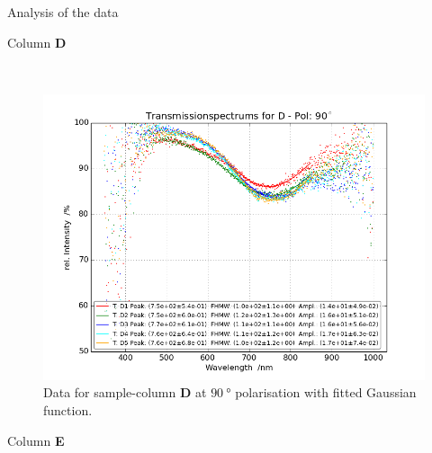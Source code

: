 \documentclass[pdftex, a4paper,11pt, twoside, UKenglish]{report}
\begin{document}
\begin{chapter}{Analysis of the data}
\begin{section}{Column \textbf{D}}
\begin{figure}[ht!]
\begin{minipage}{.95\textwidth}
          \label{fig:TransspecFIT_DPol0}
        \end{minipage}\\
        \begin{minipage}{.95\textwidth}
          \centering
          \includegraphics[width=\textwidth]
              {Figures/TransspecFIT_DPol90.png}
          \caption{Data for sample-column \textbf{D} at $\SI{90}{\degree}$
              polarisation with fitted Gaussian function.}
          \label{fig:TransspecFIT_DPol90}
        \end{minipage}
      \end{figure}
      
    \end{section}
    
    
    
    \newpage
    \begin{section}{Column \textbf{E}}
      \label{chp::DataE}
      
      

\end{section}
\end{chapter}
\end{document}
